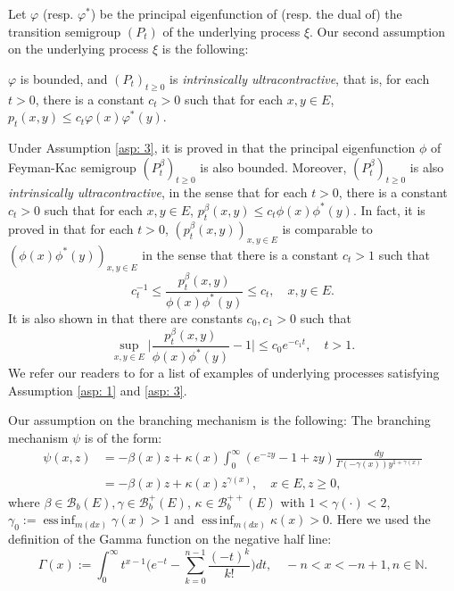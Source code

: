 \documentclass[12pt, a4paper]{amsart}
\theoremstyle{definition}
\newenvironment{asp}[1]{\renewcommand\theinnerasp{#1}\innerasp}{\endinnerasp}
\numberwithin{equation}{section}
\begin{document}
	Let $\varphi$ (resp. $\varphi^*$) be the principal eigenfunction of (resp. the dual of) the transition semigroup $(P_t)$ of the underlying process 
    $\xi$.
Our second assumption on the underlying process 
    $\xi$
 is the following:

\begin{asp}{3} \label{asp: 3}
	$\varphi$ is bounded, and 
    $(P_t)_{t\geq 0}$ 
is \emph{intrinsically ultracontractive}, that is, for each $t>0$, there is a constant $c_t >0$ such that for each $x,y\in E$, $p_t(x,y) \leq c_t \varphi(x) \varphi^*(y)$.
\end{asp}
	
	Under Assumption \ref{asp: 3},	it is proved in \cite{RenSongZhang2015Limit, RenSongZhang2017Central} that the principal eigenfunction $\phi$ of Feyman-Kac semigroup 
    $(P^\beta_t)_{t\geq 0}$ is also bounded.
	Moreover, 
$(P^\beta_t)_{t\geq 0}$ 
is also \emph{intrinsically ultracontractive}, in the sense that for each $t>0$, there is a constant $c_t >0$ such that for each $x,y\in E$, $p^\beta_t(x,y) \leq c_t \phi(x) \phi^*(y)$.
	In fact, it is proved in \cite{KimSong2008Intrinsic} that for each $t>0$, $(p^\beta_t(x,y))_{x,y\in E}$ is comparable to $(\phi(x)\phi^*(y))_{x,y\in E}$ in the sense that there is a constant $c_t > 1$ such that
\[\label{eq: p-t-beta is comparable to phi phi-star}
	c_t^{-1}
	\leq \frac {p^\beta_t(x,y)} {\phi(x)\phi^*(y)}
	\leq c_t,
	\quad x,y \in E.
\]
    It is also shown in \cite{KimSong2008Intrinsic} that
    there are constants $c_0, c_1 > 0$ such that
\[\label{eq:q(t,x,y)}
	\sup_{x,y\in E} \big|\frac{p^\beta_t(x,y)}{\phi(x)\phi^*(y)} - 1 \big| \leq c_0 e^{-c_1 t},
	\quad t > 1.
\]
	We refer our readers to \cite{RenSongZhang2015Limit} for a list of examples of underlying processes satisfying Assumption \ref{asp: 1} and \ref{asp: 3}.

		Our assumption on the branching mechanism is the following:
\begin{asp}{4} \label{asp: 4}
	The branching mechanism $\psi$ is of
	the form:
\[\begin{split}
	\psi(x,z)
	&= - \beta(x) z + \kappa(x) \int_0^\infty (e^{-z y} - 1+ z y) \frac{dy}{\Gamma(- \gamma(x)) y^{1+ \gamma(x)}}
	\\&= -\beta (x) z + \kappa(x) z^{\gamma(x)},
	\quad x\in E, z \geq 0,
\end{split}\]
	where $\beta \in \mathscr B_b(E), \gamma \in \mathscr B^+_b(E)$, $\kappa \in \mathscr B^{++}_b(E)$ with $1< \gamma(\cdot )<2$, $\gamma_0 := \operatorname{ess\,inf}_{m(dx)} \gamma(x)> 1$ and $\operatorname{ess\,inf}_{m(dx)}\kappa(x) > 0$.
\end{asp}
	Here we used the definition of the Gamma function on the negative half line:
\[\label{eq: definition of Gamma function}
	\Gamma(x)
	:= \int_0^\infty t^{x-1} \Big(e^{-t} - \sum_{k=0}^{n-1} \frac{(-t)^k}{k!}\Big) dt,
	\quad -n< x< -n+1, n\in \mathbb N.
\]
	
\end{document}
